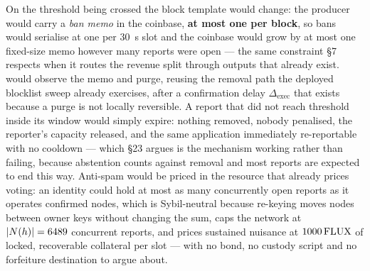 On the threshold being crossed the block template would change: the \PoN producer would carry a
\emph{ban memo} in the coinbase, \textbf{at most one per block}, so bans would serialise at one per
\SI{30}{\second} slot and the coinbase would grow by at most one fixed-size memo however many reports
were open --- the same constraint \S7 respects when it routes the revenue split through outputs that
already exist. \FluxOS would observe the memo and purge, reusing the removal path the deployed
blocklist sweep already exercises, after a confirmation delay $\Delta_{\mathrm{exec}}$ that exists
because a purge is not locally reversible. A report that did not reach threshold inside its window
would simply expire: nothing removed, nobody penalised, the reporter's capacity released, and the
same application immediately re-reportable with no cooldown --- which \S23 argues is the mechanism
working rather than failing, because abstention counts against removal and most reports are expected
to end this way. Anti-spam would be priced in the resource that already prices voting: an identity
could hold at most as many concurrently open reports as it operates confirmed nodes, which is
Sybil-neutral because re-keying moves nodes between owner keys without changing the sum, caps the
network at $\lvert N(h)\rvert = \num{6489}$ concurrent reports, and prices sustained nuisance at
$\num{1000}\,\mathrm{FLUX}$ of locked, recoverable collateral per slot --- with no bond, no custody script and
no forfeiture destination to argue about.

